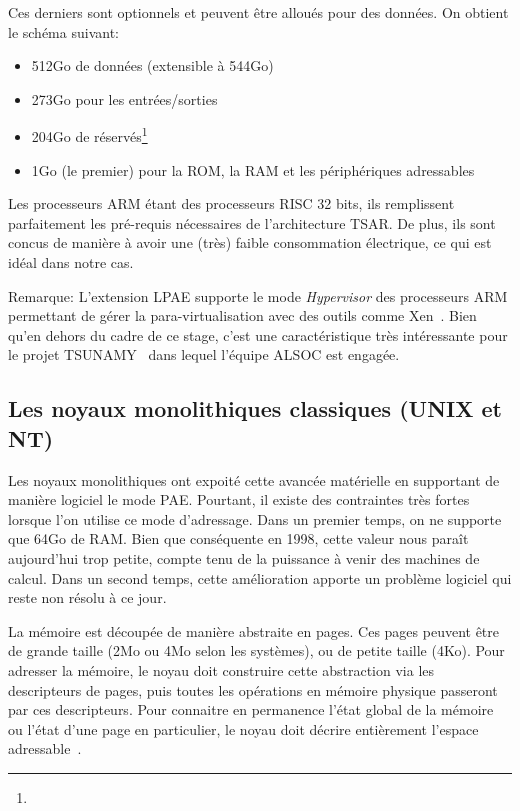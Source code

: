     Ces derniers sont optionnels et peuvent être alloués pour des données. On
    obtient le schéma suivant:

    \begin{itemize}
      \item 512Go de données (extensible à 544Go)
      \item 273Go pour les entrées/sorties
      \item 204Go de réservés\footnote{}
      \item 1Go (le premier) pour la ROM, la RAM et les périphériques
        adressables
    \end{itemize}

    Les processeurs ARM étant des processeurs RISC 32 bits, ils remplissent
    parfaitement les pré-requis nécessaires de l'architecture TSAR. De plus, ils
    sont concus de manière à avoir une (très) faible consommation électrique, ce
    qui est idéal dans notre cas.

    \begin{paragraph}{Remarque:}
      L'extension LPAE supporte le mode \textit{Hypervisor} des processeurs ARM
      permettant de gérer la para-virtualisation avec des outils comme
      Xen~\cite{barham2003xen}. Bien qu'en dehors du cadre de ce stage, c'est
      une caractéristique très intéressante pour le projet
      TSUNAMY~\cite{tsunamy2013web} dans lequel l'équipe ALSOC est engagée.
    \end{paragraph}


    \subsection{Les noyaux monolithiques classiques (UNIX et NT)}

      Les noyaux monolithiques ont expoité cette avancée matérielle en
      supportant de manière logiciel le mode PAE. Pourtant, il existe des
      contraintes très fortes lorsque l'on utilise ce mode d'adressage. Dans un
      premier temps, on ne supporte que 64Go de RAM. Bien que conséquente en
      1998, cette valeur nous paraît aujourd'hui trop petite, compte tenu de la
      puissance à venir des machines de calcul.  Dans un second temps, cette
      amélioration apporte un problème logiciel qui reste non résolu à ce
      jour.\newline

      La mémoire est découpée de manière abstraite en pages. Ces pages peuvent
      être de grande taille (2Mo ou 4Mo selon les systèmes), ou de petite taille
      (4Ko). Pour adresser la mémoire, le noyau doit construire cette
      abstraction via les descripteurs de pages, puis toutes les opérations en
      mémoire physique passeront par ces descripteurs. Pour connaitre en
      permanence l'état global de la mémoire ou l'état d'une page en
      particulier, le noyau doit décrire entièrement l'espace
      adressable~\citep{cranor1999uvm, gorman2004understanding,
        russinovich2012windows, dillon2000design, steldt2009memory,
        steldtXXXXopenbsd}.\\

